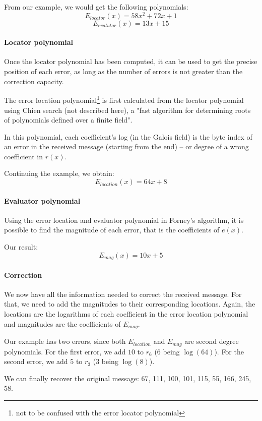 From our example, we would get the following polynomials:
\[ E_{locator}(x) = 58x^2 + 72x + 1 \]
\[ E_{evalutor}(x) = 13x + 15 \]

\paragraph{Locator polynomial}

Once the locator polynomial has been computed, it can be used to get the precise position of each error, as long as the number of errors is not greater than the correction capacity.

The error location polynomial\footnote{not to be confused with the error locator polynomial} is first calculated from the locator polynomial using Chien search (not described here), a "fast algorithm for determining roots of polynomials defined over a finite field"\cite{wiki_chien_search}.

In this polynomial, each coefficient's log (in the Galois field) is the byte index of an error in the received message (starting from the end) -- or degree of a wrong coefficient in $r(x)$.

Continuing the example, we obtain: \[ E_{location}(x) = 64x + 8 \]

\paragraph{Evaluator polynomial}

Using the error location and evaluator polynomial in Forney's algorithm, it is possible to find the magnitude of each error, that is the coefficients of $e(x)$.

Our result: \[ E_{mag}(x) = 10x + 5 \]

\paragraph{Correction}

We now have all the information needed to correct the received message. For that, we need to add the magnitudes to their corresponding locations. Again, the locations are the logarithms of each coefficient in the error location polynomial and magnitudes are the coefficients of $E_{mag}$.

Our example has two errors, since both $E_{location}$ and $E_{mag}$ are second degree polynomials.
For the first error, we add $10$ to $r_6$ ($6$ being $\log(64)$).
For the second error, we add $5$ to $r_3$ ($3$ being $\log(8)$).

We can finally recover the original message: 67, 111, 100, 101, 115, 55, 166, 245, 58.
